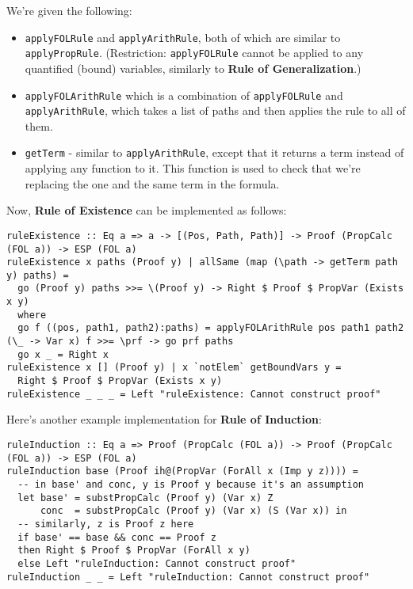 \documentclass{article}
\begin{document}
We're given the following:

\begin{itemize}
\item \texttt{applyFOLRule} and \texttt{applyArithRule}, both of which are similar to \texttt{applyPropRule}. (Restriction: \texttt{applyFOLRule} cannot be applied to any quantified (bound) variables, similarly to \textbf{Rule of Generalization}.)
\item \texttt{applyFOLArithRule} which is a combination of \texttt{applyFOLRule} and \texttt{applyArithRule}, which takes a list of paths and then applies the rule to all of them.
\item \texttt{getTerm} - similar to \texttt{applyArithRule}, except that it returns a term instead of applying any function to it. This function is used to check that we're replacing the one and the same term in the formula.
\end{itemize}

Now, \textbf{Rule of Existence} can be implemented as follows:

\begin{lstlisting}
ruleExistence :: Eq a => a -> [(Pos, Path, Path)] -> Proof (PropCalc (FOL a)) -> ESP (FOL a)
ruleExistence x paths (Proof y) | allSame (map (\path -> getTerm path y) paths) =
  go (Proof y) paths >>= \(Proof y) -> Right $ Proof $ PropVar (Exists x y)
  where
  go f ((pos, path1, path2):paths) = applyFOLArithRule pos path1 path2 (\_ -> Var x) f >>= \prf -> go prf paths
  go x _ = Right x
ruleExistence x [] (Proof y) | x `notElem` getBoundVars y =
  Right $ Proof $ PropVar (Exists x y)
ruleExistence _ _ _ = Left "ruleExistence: Cannot construct proof"
\end{lstlisting}

Here's another example implementation for \textbf{Rule of Induction}:

\begin{lstlisting}
ruleInduction :: Eq a => Proof (PropCalc (FOL a)) -> Proof (PropCalc (FOL a)) -> ESP (FOL a)
ruleInduction base (Proof ih@(PropVar (ForAll x (Imp y z)))) =
  -- in base' and conc, y is Proof y because it's an assumption
  let base' = substPropCalc (Proof y) (Var x) Z
      conc  = substPropCalc (Proof y) (Var x) (S (Var x)) in
  -- similarly, z is Proof z here
  if base' == base && conc == Proof z
  then Right $ Proof $ PropVar (ForAll x y)
  else Left "ruleInduction: Cannot construct proof"
ruleInduction _ _ = Left "ruleInduction: Cannot construct proof"
\end{lstlisting}
\end{document}
